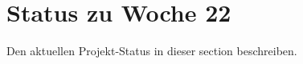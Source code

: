 \section{Status zu Woche 22
}\label{sec:status}

Den aktuellen Projekt-Status in  dieser section beschreiben.

